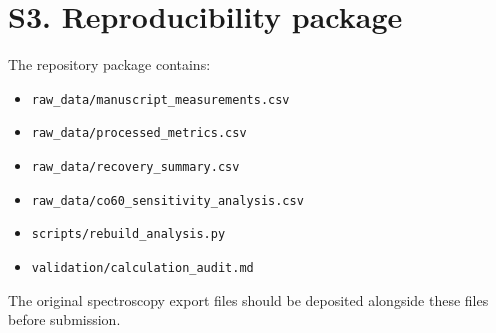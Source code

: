 \documentclass[12pt]{article}
\begin{document}
\section*{S3. Reproducibility package}

The repository package contains:
\begin{itemize}
  \item \texttt{raw\_data/manuscript\_measurements.csv}
  \item \texttt{raw\_data/processed\_metrics.csv}
  \item \texttt{raw\_data/recovery\_summary.csv}
  \item \texttt{raw\_data/co60\_sensitivity\_analysis.csv}
  \item \texttt{scripts/rebuild\_analysis.py}
  \item \texttt{validation/calculation\_audit.md}
\end{itemize}

The original spectroscopy export files should be deposited alongside
these files before submission.
\end{document}

